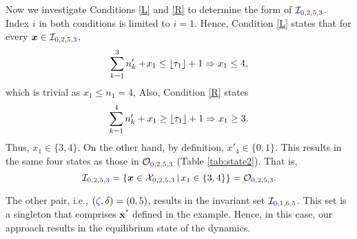 \documentclass[10 pt,twocolumn,journal]{IEEEtran}
\DeclarePairedDelimiter{\floor}{\lfloor}{\rfloor}
\theoremstyle{plain}
\newcommand{\I}{\mathcal{I}}
\newcommand{\X}{\mathcal{X}}
\newcommand{\x}{\bm{x}}
\renewcommand{\r}{\tb{\zeta}}
\newcommand{\rr}{\tb{\zeta'}}
\newcommand{\s}{\tr{\eta}}
\renewcommand{\ss}{\tr{\eta'}}
\renewcommand{\d}{{\delta}}
\renewcommand{\o}{\tr{\mathtt{b}}}
\newcommand{\oo}{\tr{\mathtt{c}}}
\newcommand{\nn}{\tb{\mathtt{d}}}
\newcommand{\tb}{\textcolor{blue}}
\newcommand{\tr}{\textcolor{Myred}}
\theoremstyle{definition}
\begin{document}
Now we investigate Conditions \ref{L} and \ref{R} to determine the form of $\I_{\tb{0}, \tr{2}, \tr{5}, \tb{3}}$.
Index $i$ in both conditions is limited to $i=1$.
Hence, Condition \ref{L} states that for every $\x\in\I_{\tb{0}, \tr{2}, \tr{5}, \tb{3}}$,
\begin{equation*} 
         \sum_{k=1}^{3} n'_k +\! x_1 \leq \floor{\tau_1}+1 
         \Rightarrow 
         x_1 \leq 4,
\end{equation*}    
which is trivial as $x_1\leq n_1 = 4$,
Also, Condition \ref{R} states
\begin{equation*}
        \sum_{k=1}^{4} n'_k + x_1 
        \geq \floor{\tau_1}+1
        \Rightarrow
        x_1 \geq 3.
\end{equation*}
Thus, $x_1 \in\{3,4\}$.
On the other hand, by definition, $x'_4 \in \{0,1\}$.
This results in the same four states as those in $\mathcal{O}_{\tb{0}, \tr{2}, \tr{5}, \tb{3}}$ (Table \ref{tab:state2}).
That is,
\begin{equation*}
    \I_{\tb{0}, \tr{2}, \tr{5}, \tb{3}}
    = \left\{\x\in\X_{\tb{0}, \tr{2}, \tr{5}, \tb{3}}\,|\,x_1 \in\{3,4\}\right\}
    = \mathcal{O}_{\tb{0}, \tr{2}, \tr{5}, \tb{3}}.
\end{equation*}



The other pair, i.e., $(\r, \d) = (0,5)$, results in the invariant set $\I_{\tb{0}, \tr{1}, \tr{6}, \tb{5}}$.
This set is a singleton that comprises $\x^*$ defined in the example. 
Hence, in this case, our approach results in the equilibrium state of the dynamics.
\end{document}
